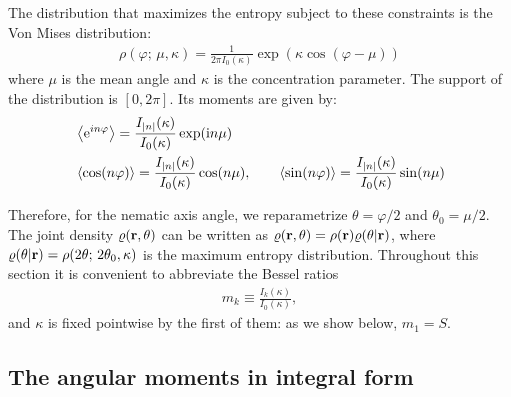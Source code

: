 \documentclass[a5paper]{article}
\begin{document}
The distribution that maximizes the entropy subject to these constraints is the Von Mises distribution:
\begin{align}
    \label{von-mises}
    \rho(\varphi;\,\mu,\kappa) = \frac{1}{2\pi I_0(\kappa)} \exp(\kappa \cos(\varphi-\mu))
\end{align}
where $\mu$ is the mean angle and $\kappa$ is the concentration parameter. The support of the distribution is $[0, 2\pi]$.
Its moments are given by:
\begin{align}
    &\left\langle \mathrm{e}^{i n \varphi} \right\rangle = \frac{I_{|n|}(\kappa)}{I_0(\kappa)} \exp(\mathrm{i} n \mu)
    \\
&\left\langle \cos(n \varphi) \right\rangle = \frac{I_{|n|}(\kappa)}{I_0(\kappa)} \cos(n \mu)
,\qquad
\left\langle \sin(n \varphi) \right\rangle = \frac{I_{|n|}(\kappa)}{I_0(\kappa)} \sin(n \mu)
\end{align}

Therefore, for the nematic axis angle, we reparametrize $\theta = \varphi/2$ and $\theta_0 = \mu/2$.
The joint density $\varrho(\mathbf{r}, \theta)$ can be written as $\varrho(\mathbf{r}, \theta) = \rho(\mathbf{r}) \varrho(\theta|\mathbf{r})$, where $\varrho(\theta|\mathbf{r})=\rho(2\theta;\,2\theta_0, \kappa)$ is the maximum entropy distribution. Throughout this section it is convenient to abbreviate the Bessel ratios
\begin{align}
    \label{bessel-ratios}
    m_k \equiv \frac{I_k(\kappa)}{I_0(\kappa)},
\end{align}
and $\kappa$ is fixed pointwise by the first of them: as we show below, $m_1 = S$.

\subsection{The angular moments in integral form}
\label{sec-moments-integral}
\end{document}
